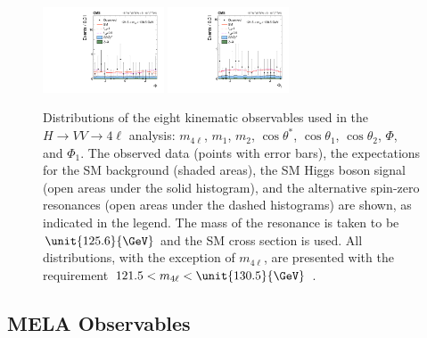 \begin{figure}
\includegraphics[width=0.32\textwidth]{Spin_Parity/cCompare_DataMC_AllTeV_helphi_SignalEnriched.pdf}
\includegraphics[width=0.32\textwidth]{Spin_Parity/cCompare_DataMC_AllTeV_phistarZ1_SignalEnriched.pdf}
\caption[Distributions of the eight kinematic observables used in the $H \to VV \to 4\ell$ analysis:
$m_{4\ell}$,
$m_1$,
$m_2$,
$\cos\theta^*$,
$\cos\theta_{1}$,
$\cos\theta_{2}$,
$\Phi$, and
$\Phi_{1}$.
The observed data (points with error bars), the expectations for the SM background (shaded areas),
the SM Higgs boson signal (open areas under the solid histogram),
and the alternative spin-zero resonances (open areas under the dashed histograms) are shown,
as indicated in the legend.
The mass of the resonance is taken to be $\unit{125.6}{\GeV}$ and the SM cross section is used.
All distributions, with the exception of $m_{4\ell}$, are presented with the requirement
$121.5 < m_{4\ell} < \unit{130.5}{\GeV}$.]{
Distributions of the eight kinematic observables used in the $H \to VV \to 4\ell$ analysis:
$m_{4\ell}$,
$m_1$,
$m_2$,
$\cos\theta^*$,
$\cos\theta_{1}$,
$\cos\theta_{2}$,
$\Phi$, and
$\Phi_{1}$.
The observed data (points with error bars), the expectations for the SM background (shaded areas),
the SM Higgs boson signal (open areas under the solid histogram),
and the alternative spin-zero resonances (open areas under the dashed histograms) are shown,
as indicated in the legend.
The mass of the resonance is taken to be $\unit{125.6}{\GeV}$ and the SM cross section is used.
All distributions, with the exception of $m_{4\ell}$, are presented with the requirement
$121.5 < m_{4\ell} < \unit{130.5}{\GeV}$ \cite{Khachatryan:2014kca}.
}
\label{fig:kinematics_sp}

\end{figure}

\subsection{MELA Observables} 
\label{sec:KDMethod}

